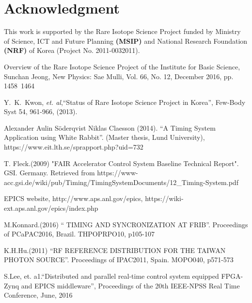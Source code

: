 \documentclass[journal,reqno]{IEEEtran}
\begin{document}
\section*{Acknowledgment}
This work is supported by the Rare Isotope Science Project funded by Ministry of Science, ICT and Future Planning \textbf{(MSIP)} and National Research Foundation \textbf{(NRF)} of Korea (Project No. 2011-0032011).



%
%
%
\begin{thebibliography}{3}

Overview of the Rare Isotope Science Project of the Institute for Basic Science, Sunchan Jeong, New Physics: Sae Mulli, Vol. 66, No. 12, December 2016, pp. 1458~1464

 Y.~K.~Kwon, {\it et. al},``Status of Rare Isotope Science Project in Korea'',
Few-Body Syst 54, 961-966, (2013).

Alexander Aulin Söderqvist Niklas Claesson (2014). “A Timing System Application using White Rabbit”. (Master thesis, Lund University), https://www.eit.lth.se/sprapport.php?uid=732

T. Fleck.(2009) "FAIR Accelerator Control System Baseline Technical Report". GSI. Germany. Retrieved from https://www-acc.gsi.de/wiki/pub/Timing/TimingSystemDocuments/12\_Timing-System.pdf

EPICS website, http://www.aps.anl.gov/epics, https://wiki-ext.aps.anl.gov/epics/index.php

M.Konnard.(2016) “ TIMING AND SYNCRONIZATION AT FRIB”. Proceedings of PCaPAC2016, Brazil. THPOPRPO10, p105-107

K.H.Hu.(2011) “RF REFERENCE DISTRIBUTION FOR THE TAIWAN PHOTON SOURCE”. Proceedings of IPAC2011, Spain. MOPO040, p571-573

S.Lee, et. a1.“Distributed and parallel real-time control system equipped FPGA-Zynq and EPICS middleware”, Proceedings of the 20th IEEE-NPSS Real Time Conference, June, 2016 


\end{thebibliography}

\end{document}
